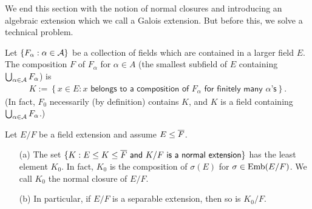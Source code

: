 We end this section with the notion of normal closures and introducing an algebraic extension which we call a Galois extension.
But before this, we solve a technical problem.
\begin{obs}\label{composition of infinitely many  fields}
    Let $\{F_\alpha: \alpha\in{\mathcal{A}}\}$ be a collection of fields which are contained in a larger field $E$.
    The composition $F$ of $F_\alpha$ for $\alpha\in A$ (the smallest subfield of $E$ containing $\bigcup_{\alpha\in{\mathcal{A}}} F_\alpha$) is
    \begin{align*}
        K:=\left\{x\in E: \textsf{$x$ belongs to a composition of $F_\alpha$ for finitely many $\alpha$'s}\right\}.
    \end{align*}
    (In fact, $F_0$ necessarily (by definition) contains $K$, and $K$ is a field containing $\bigcup_{\alpha\in{\mathcal{A}}} F_\alpha$.)
\end{obs}
\begin{thm}\label{normal closure}
    Let $E/F$ be a field extension and assume $E\leq\overline{F}$.
    \begin{enumerate}
        \item[(a)]
        {
            The set $\{K: \textsf{$E\leq K\leq\overline{F}$ and $K/F$ is a normal extension}\}$ has the least element $K_0$.
            In fact, $K_0$ is the composition of $\sigma(E)$ for $\sigma\in{\textrm{Emb}({E/F})}$.
            We call $K_0$ the normal closure of $E/F$.
        }
        \item[(b)]
        {
            In particular, if $E/F$ is a separable extension, then so is $K_0/F$.
        }
    \end{enumerate}
\end{thm}
